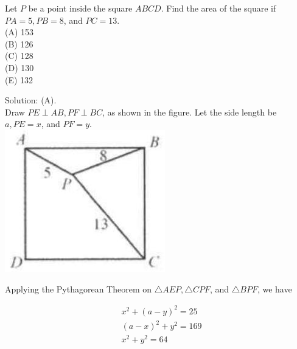 \documentclass{article}
\begin{document}
Let \(P\) be a point inside the square \(A B C D\). Find the area of the square if \(P A=5, P B=8\), and \(P C=13\).\\
(A) 153\\
(B) 126\\
(C) 128\\
(D) 130\\
(E) 132

Solution: (A).\\
Draw \(P E \perp A B, P F \perp B C\), as shown in the figure. Let the side length be \(a, P E=x\), and \(P F=y\).\\
\centering
\includegraphics[width=\textwidth]{images/080(1).jpg}

Applying the Pythagorean Theorem on \(\triangle A E P, \triangle C P F\), and \(\triangle B P F\), we have

\[
\begin{aligned}
& x^{2}+(a-y)^{2}=25 \\
& (a-x)^{2}+y^{2}=169 \\
& x^{2}+y^{2}=64
\end{aligned}
\]
\end{document}
